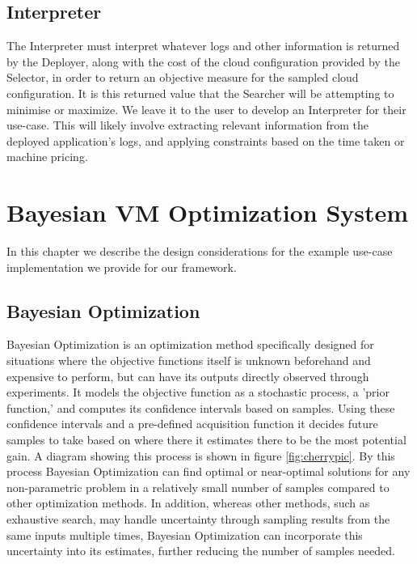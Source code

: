 \documentclass{report}
\begin{document}
\section{Interpreter}
The Interpreter must interpret whatever logs and other information is returned by the Deployer, along with the cost of the cloud configuration provided by the Selector, in order to return an objective measure for the sampled cloud configuration. It is this returned value that the Searcher will be attempting to minimise or maximize. We leave it to the user to develop an Interpreter for their use-case. This will likely involve extracting relevant information from the deployed application's logs, and applying constraints based on the time taken or machine pricing. 

\chapter{Bayesian VM Optimization System}
In this chapter we describe the design considerations for the example use-case implementation we provide for our framework.

\section{Bayesian Optimization}
Bayesian Optimization is an optimization method specifically designed for situations where the objective functions itself is unknown beforehand and expensive to perform, but can have its outputs directly observed through experiments\cite{Snoek2012}. It models the objective function as a stochastic process, a 'prior function,' and computes its confidence intervals based on samples. Using these confidence intervals and a pre-defined acquisition function it decides future samples to take based on where there it estimates there to be the most potential gain. A diagram showing this process is shown in figure \ref{fig:cherrypic}. By this process Bayesian Optimization can find optimal or near-optimal solutions for any non-parametric problem in a relatively small number of samples compared to other optimization methods. In addition, whereas other methods, such as exhaustive search, may handle uncertainty through sampling results from the same inputs multiple times, Bayesian Optimization can incorporate this uncertainty into its estimates, further reducing the number of samples needed.
\end{document}
